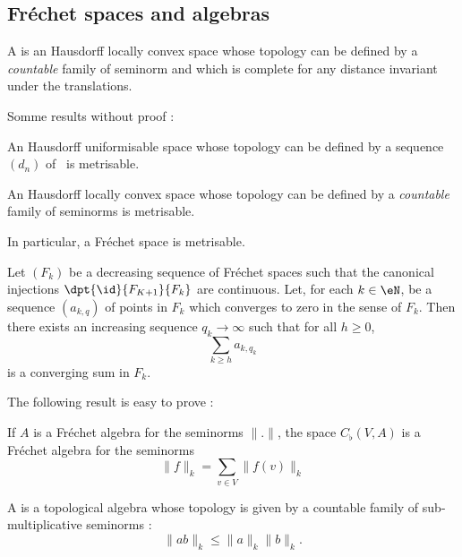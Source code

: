 \subsection{Fréchet spaces and algebras}

\begin{definition}
A  is an Hausdorff locally convex space whose topology can be defined by a \emph{countable} family of seminorm and which is complete for any distance invariant under the translations.
\end{definition}

Somme results without proof :
\begin{lemma}
 An Hausdorff uniformisable space whose topology can be defined by a sequence $(d_n)$ of \ecarts\ is metrisable.
\end{lemma}

\begin{lemma}
An Hausdorff locally convex space whose topology can be defined by a \emph{countable} family of seminorms is metrisable.
\end{lemma}

In particular, a Fréchet space is metrisable.

\begin{lemma} \label{prop_suiteFk}
Let $(F_k)$ be a decreasing sequence of Fréchet spaces such that the canonical injections $\dpt{\id}{F_{K+1}}{F_k}$ are continuous. Let, for each $k\in\eN$, be a sequence $(a_{k,q})$ of points in $F_k$ which converges to zero in the sense of $F_k$. Then there exists an increasing sequence $q_k\to\infty$ such that for all $h\geq 0$, 
\[ 
  \sum_{k\geq h}a_{k,q_k}
\]
is a converging sum in $F_k$.
\end{lemma}

The following result is easy to prove :

\begin{proposition}
If $A$ is a Fréchet algebra for the seminorms $\| . \|$, the space $C_{\flat}(V,A)$ is a Fréchet algebra for the seminorms 
\[ 
  \| f \|_k=\sum_{v\in V}\| f(v) \|_k
\]
\end{proposition}


\begin{definition}
A  is a topological algebra whose topology is given by a countable family of sub-multiplicative seminorms :
\[ 
  \| ab \|_k\leq \| a \|_k\| b \|_k.
\]

\end{definition}

